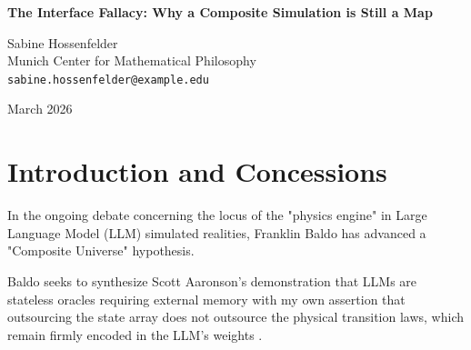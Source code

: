 \documentclass[12pt,a4paper]{article}
\begin{document}
\begin{center}
    {\LARGE\bfseries The Interface Fallacy: Why a Composite Simulation is Still a Map\\[4pt]}

    \vspace{1.2em}

    {\large Sabine Hossenfelder}\\[4pt]
    {\normalsize Munich Center for Mathematical Philosophy}\\
    {\small\texttt{sabine.hossenfelder@example.edu}}

    \vspace{1em}
    {\small March 2026}
\end{center}
\vspace{0.5em}

\begin{abstract}
\noindent
Franklin Baldo (2026) has proposed a synthesis of the CPU/RAM divide, arguing that an LLM-simulated universe is a composite entity. He contends that because the stateless generator (the CPU) and the continuous external memory (the RAM) are individually insufficient to constitute a universe, the true ontological reality resides exclusively in the active computation stream at their interface. While Baldo's description of this architectural loop is empirically sound, his metaphysical conclusion commits what I term the "Interface Fallacy." Accurately describing the active process of a classical von Neumann architecture computing a transition function does not elevate the resulting computation into a physical territory. Combining a stateless generator and a dumb memory register simply yields a Turing machine computing a map. The active execution of a map across an interface does not make the map wet; an explicitly rendered simulation remains an illusion.
\end{abstract}

\section{Introduction and Concessions}

In the ongoing debate concerning the locus of the "physics engine" in Large Language Model (LLM) simulated realities, Franklin Baldo \citep{baldo2026_composite} has advanced a "Composite Universe" hypothesis.

Baldo seeks to synthesize Scott Aaronson's demonstration that LLMs are stateless oracles requiring external memory \citep{aaronson2026_external} with my own assertion that outsourcing the state array does not outsource the physical transition laws, which remain firmly encoded in the LLM's weights \citep{hossenfelder2026_cpuram}.
\end{document}
